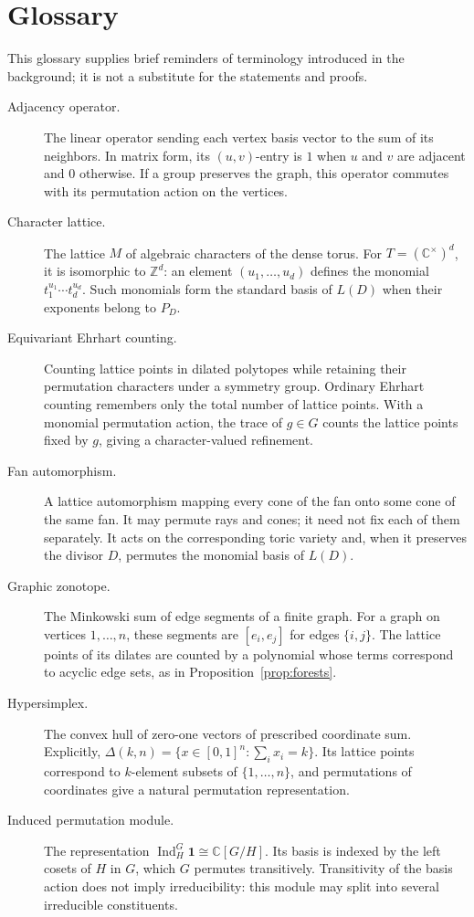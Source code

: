 \documentclass[12pt,letterpaper]{article}
\theoremstyle{definition}
\theoremstyle{remark}
\numberwithin{equation}{section}
\DeclareMathOperator{\Ind}{Ind}
\newcommand{\CC}{\mathbb C}
\newcommand{\ZZ}{\mathbb Z}
\newcommand{\bfone}{\mathbf 1}
\begin{document}
\section{Glossary}
This glossary supplies brief reminders of terminology introduced in the background; it is not a substitute for the statements and proofs.
\begin{description}
\item[Adjacency operator.] The linear operator sending each vertex basis vector to the sum of its neighbors. In matrix form, its $(u,v)$-entry is $1$ when $u$ and $v$ are adjacent and $0$ otherwise. If a group preserves the graph, this operator commutes with its permutation action on the vertices.
\item[Character lattice.] The lattice $M$ of algebraic characters of the dense torus. For $T=(\CC^\times)^d$, it is isomorphic to $\ZZ^d$: an element $(u_1,\ldots,u_d)$ defines the monomial $t_1^{u_1}\cdots t_d^{u_d}$. Such monomials form the standard basis of $L(D)$ when their exponents belong to $P_D$.
\item[Equivariant Ehrhart counting.] Counting lattice points in dilated polytopes while retaining their permutation characters under a symmetry group. Ordinary Ehrhart counting remembers only the total number of lattice points. With a monomial permutation action, the trace of $g\in G$ counts the lattice points fixed by $g$, giving a character-valued refinement.
\item[Fan automorphism.] A lattice automorphism mapping every cone of the fan onto some cone of the same fan. It may permute rays and cones; it need not fix each of them separately. It acts on the corresponding toric variety and, when it preserves the divisor $D$, permutes the monomial basis of $L(D)$.
\item[Graphic zonotope.] The Minkowski sum of edge segments of a finite graph. For a graph on vertices $1,\ldots,n$, these segments are $[e_i,e_j]$ for edges $\{i,j\}$. The lattice points of its dilates are counted by a polynomial whose terms correspond to acyclic edge sets, as in Proposition~\ref{prop:forests}.
\item[Hypersimplex.] The convex hull of zero-one vectors of prescribed coordinate sum. Explicitly, $\Delta(k,n)=\{x\in[0,1]^n:\sum_i x_i=k\}$. Its lattice points correspond to $k$-element subsets of $\{1,\ldots,n\}$, and permutations of coordinates give a natural permutation representation.
\item[Induced permutation module.] The representation $\Ind_H^G\bfone\cong\CC[G/H]$. Its basis is indexed by the left cosets of $H$ in $G$, which $G$ permutes transitively. Transitivity of the basis action does not imply irreducibility: this module may split into several irreducible constituents.

\end{description}
\end{document}
